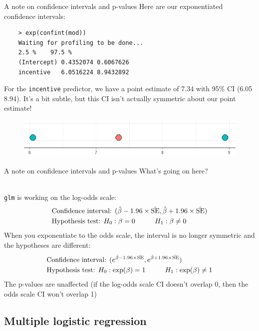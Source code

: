 \documentclass[10pt,t]{beamer}
\newcommand\tab[1][1cm]{\hspace*{#1}}
\begin{document}
\begin{frame}[fragile]{A note on confidence intervals and p-values}
	\vspace{-0.7cm}
	Here are our exponentiated confidence intervals:
	
		\begin{verbatim}
	> exp(confint(mod))
	Waiting for profiling to be done...
	2.5 %    97.5 %
	(Intercept) 0.4352074 0.6067626
	incentive   6.0516224 8.9432892
	\end{verbatim}
	For the \texttt{incentive} predictor, we have a point estimate of 7.34 with 95\% CI (6.05 8.94). It's a bit subtle, but this CI isn't actually symmetric about our point estimate!
	\medskip
	
	\begin{figure}
		\centering
		\includegraphics[scale = 0.4]{figs/confint}
	\end{figure}

\end{frame}

\begin{frame}{A note on confidence intervals and p-values}
	What's going on here? 
	\\ ~\
	
	\texttt{glm} is working on the log-odds scale:
	\begin{align*}
		&\text{Confidence interval: }(\hat{\beta} - 1.96 \times \hat{\text{SE}}, \hat{\beta} + 1.96 \times \hat{\text{SE}})\\
		&\text{Hypothesis test: }H_0: \beta = 0 \tab H_1: \beta \neq 0
	\end{align*}
	When you exponentiate to the odds scale, the interval is no longer symmetric and the hypotheses are different:
	\begin{align*}
		&\text{Confidence interval: }(e^{\hat{\beta} - 1.96 \times \hat{\text{SE}}}, e^{\hat{\beta} + 1.96 \times \hat{\text{SE}}})\\
		&\text{Hypothesis test: }H_0: \exp(\beta) = 1 \tab H_1: \exp(\beta) \neq 1
	\end{align*} 
	The p-values are unaffected (if the log-odds scale CI doesn't overlap 0, then the odds scale CI won't overlap 1)
\end{frame}
%
\subsection{Multiple logistic regression}
\end{document}
